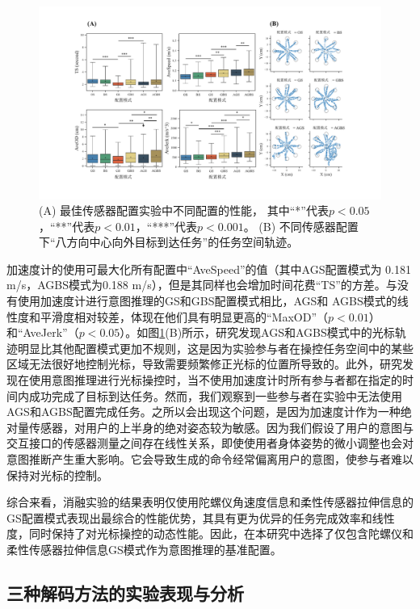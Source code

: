 \begin{figure}[htb]
    \centering
    \includegraphics[width=1\textwidth]{figures/3-Fig-10.pdf}
    \caption{(A) 最佳传感器配置实验中不同配置的性能， 其中``*''代表$p<0.05$，``**''代表$p<0.01$，``***''代表$p<0.001$。 (B) 不同传感器配置下``八方向中心向外目标到达任务''的任务空间轨迹。}
    \label{fig:3-10}
\end{figure}  
加速度计的使用可最大化所有配置中``AveSpeed''的值（其中AGS配置模式为 0.181 m/s，AGBS模式为0.188 m/s），但是其同样也会增加时间花费``TS''的方差。与没有使用加速度计进行意图推理的GS和GBS配置模式相比，AGS和 AGBS模式的线性度和平滑度相对较差，体现在他们具有明显更高的``MaxOD''（$p<0.01$）和``AveJerk''（$p<0.05$）。如图\ref{fig:3-10}(B)所示，研究发现AGS和AGBS模式中的光标轨迹明显比其他配置模式更加不规则，这是因为实验参与者在操控任务空间中的某些区域无法很好地控制光标，导致需要频繁修正光标的位置所导致的。此外，研究发现在使用意图推理进行光标操控时，当不使用加速度计时所有参与者都在指定的时间内成功完成了目标到达任务。然而，我们观察到一些参与者在实验中无法使用AGS和AGBS配置完成任务。之所以会出现这个问题，是因为加速度计作为一种绝对量传感器，对用户的上半身的绝对姿态较为敏感。因为我们假设了用户的意图与交互接口的传感器测量之间存在线性关系，即使使用者身体姿势的微小调整也会对意图推断产生重大影响。它会导致生成的命令经常偏离用户的意图，使参与者难以保持对光标的控制。

综合来看，消融实验的结果表明仅使用陀螺仪角速度信息和柔性传感器拉伸信息的GS配置模式表现出最综合的性能优势，其具有更为优异的任务完成效率和线性度，同时保持了对光标操控的动态性能。因此，在本研究中选择了仅包含陀螺仪和柔性传感器拉伸信息GS模式作为意图推理的基准配置。

\subsection{三种解码方法的实验表现与分析}     

